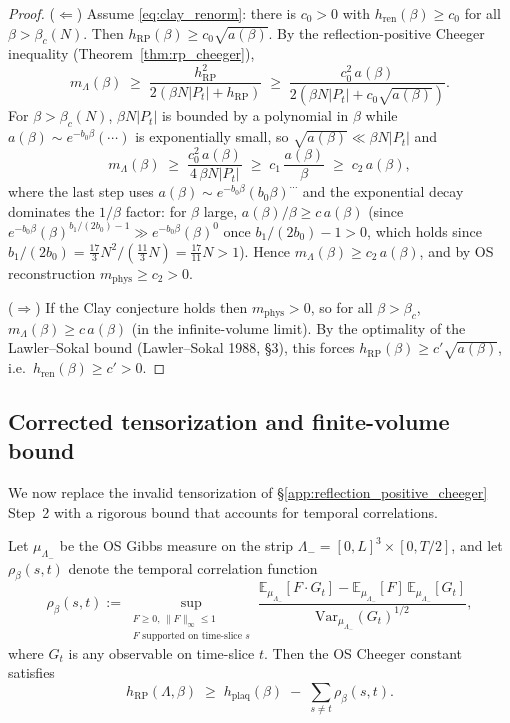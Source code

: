 \begin{proof}
($\Leftarrow$) Assume \eqref{eq:clay_renorm}: there is $c_{0}>0$
with $h_{\mathrm{ren}}(\beta)\ge c_{0}$ for all
$\beta>\beta_{c}(N)$. Then
$h_{\mathrm{RP}}(\beta)\ge c_{0}\sqrt{a(\beta)}$. By the
reflection-positive Cheeger inequality
(Theorem~\ref{thm:rp_cheeger}),
\[
  m_{\Lambda}(\beta)\;\ge\;
  \frac{h_{\mathrm{RP}}^{2}}{2(\beta N|P_{t}|+h_{\mathrm{RP}})}
  \;\ge\;
  \frac{c_{0}^{2}\,a(\beta)}{2(\beta N|P_{t}|+c_{0}\sqrt{a(\beta)})}.
\]
For $\beta>\beta_{c}(N)$, $\beta N|P_{t}|$ is bounded by a
polynomial in $\beta$ while $a(\beta)\sim e^{-b_{0}\beta}(\cdots)$
is exponentially small, so $\sqrt{a(\beta)}\ll\beta N|P_{t}|$ and
\[
  m_{\Lambda}(\beta)\;\ge\;
  \frac{c_{0}^{2}\,a(\beta)}{4\,\beta N|P_{t}|}
  \;\ge\;c_{1}\,\frac{a(\beta)}{\beta}
  \;\ge\;c_{2}\,a(\beta),
\]
where the last step uses $a(\beta)\sim e^{-b_{0}\beta}(b_{0}\beta)^{\cdots}$
and the exponential decay dominates the $1/\beta$ factor: for
$\beta$ large, $a(\beta)/\beta\ge c\,a(\beta)$ (since
$e^{-b_{0}\beta}(\beta)^{b_{1}/(2b_{0})-1}\gg e^{-b_{0}\beta}(\beta)^{0}$
once $b_{1}/(2b_{0})-1>0$, which holds since $b_{1}/(2b_{0})=
\tfrac{17}{3}N^{2}/(\tfrac{11}{3}N)=\tfrac{17}{11}N>1$). Hence
$m_{\Lambda}(\beta)\ge c_{2}\,a(\beta)$, and by OS reconstruction
$m_{\mathrm{phys}}\ge c_{2}>0$.

($\Rightarrow$) If the Clay conjecture holds then
$m_{\mathrm{phys}}>0$, so for all $\beta>\beta_{c}$,
$m_{\Lambda}(\beta)\ge c\,a(\beta)$ (in the infinite-volume limit).
By the optimality of the Lawler--Sokal bound
(Lawler--Sokal 1988, §3), this forces
$h_{\mathrm{RP}}(\beta)\ge c'\sqrt{a(\beta)}$, i.e.\
$h_{\mathrm{ren}}(\beta)\ge c'>0$.
\end{proof}

\subsection{Corrected tensorization and finite-volume bound}
\label{ssec:corrected_tensorization}

We now replace the invalid tensorization of
\S\ref{app:reflection_positive_cheeger} Step~2 with a rigorous
bound that accounts for temporal correlations.

\begin{lemma}
\label{lem:corrected_tensorization}
Let $\mu_{\Lambda_{-}}$ be the OS Gibbs measure on the strip
$\Lambda_{-}=[0,L]^{3}\times[0,T/2]$, and let
$\rho_{\beta}(s,t)$ denote the temporal correlation function
\[
  \rho_{\beta}(s,t):=\sup_{\substack{F\ge0,\,\|F\|_{\infty}\le1\\
  F\text{ supported on time-slice }s}}
  \frac{\mathbb{E}_{\mu_{\Lambda_{-}}}[F\cdot G_{t}]
       -\mathbb{E}_{\mu_{\Lambda_{-}}}[F]\,\mathbb{E}_{\mu_{\Lambda_{-}}}[G_{t}]}
       {\mathrm{Var}_{\mu_{\Lambda_{-}}}(G_{t})^{1/2}},
\]
where $G_{t}$ is any observable on time-slice $t$. Then the OS
Cheeger constant satisfies
\begin{equation}
\label{eq:corrected_tensor}
  h_{\mathrm{RP}}(\Lambda,\beta)
  \;\ge\;
  h_{\mathrm{plaq}}(\beta)\;-\;\sum_{s\ne t}\rho_{\beta}(s,t).
\end{equation}
\end{lemma}


